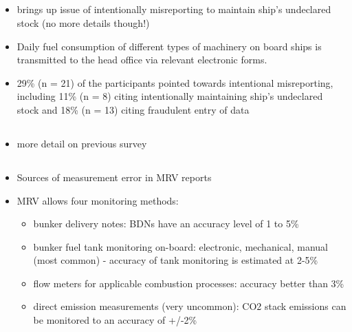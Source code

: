 \documentclass{article}
\newcommand{\paperpath}{../resources/}
\newcommand{\myhref}[2]{\href{run:\paperpath#1}{#2}}
\begin{document}
\subsection{\myhref{Rony 2019 - Exploring the new policy framework of environmental performance management for shipping.pdf}{\textcite{rony2019exploring}}}
\begin{itemize}
    \item brings up issue of intentionally misreporting to maintain ship's undeclared stock (no more details though!)
    \item Daily fuel consumption of different types of machinery on board ships is transmitted to the head office via relevant electronic forms.
    \item 29\% (n = 21) of the participants pointed towards intentional misreporting, including 11\% (n = 8) citing intentionally maintaining ship’s undeclared stock and 18\% (n = 13) citing
    fraudulent entry of data
\end{itemize}
\subsection{\myhref{Rony 2017 - Ensuring the effective implementation of the monitoring reportin.pdf}{\textcite{rony2017ensuring}}}
\begin{itemize}
    \item more detail on previous survey
\end{itemize}

\subsection{\myhref{Fridell et al 2018 - Transport work and emissions in MRV.pdf}{\textcite{fridell2018transport}}}
\begin{itemize}
    \item Sources of measurement error in MRV reports
    \item MRV allows four monitoring methods:
    \begin{itemize}
        \item bunker delivery notes: BDNs have an accuracy level of 1 to 5\%
        \item bunker fuel tank monitoring on-board: electronic, mechanical, manual (most common) - accuracy of tank monitoring is estimated at 2-5\%
        \item flow meters for applicable combustion processes: accuracy better than 3\%
        \item direct emission measurements (very uncommon): CO2 stack
        emissions can be monitored to an accuracy of +/-2\%
    \end{itemize}
\end{itemize}
\end{document}
